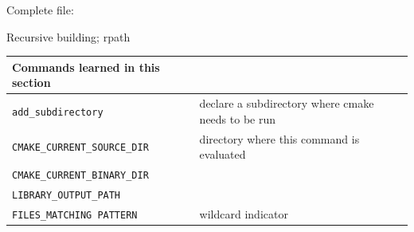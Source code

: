 Complete  file:
%


\newpage
{} {Recursive building; rpath}
\label{sec:cmake-install-dirs}
\label{sec:cmake-rpath}


\begin{tabular}{lp{3in}}
  \toprule
  Commands learned in this section\\
  \midrule
  \lstinline+add_subdirectory+&declare a subdirectory where cmake needs to be run\\
  \lstinline+CMAKE_CURRENT_SOURCE_DIR+&directory where this command is evaluated\\
  \lstinline+CMAKE_CURRENT_BINARY_DIR+&\\
  \lstinline+LIBRARY_OUTPUT_PATH+&\\
  \lstinline+FILES_MATCHING PATTERN+&wildcard indicator\\
  \bottomrule
\end{tabular}

